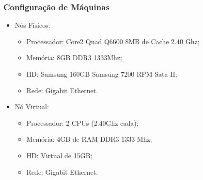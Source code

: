 \documentclass{beamer}
\begin{document}
\begin{frame} \frametitle{Configuração de Máquinas}
\begin{itemize}
	\item Nós Físicos:
	\begin{itemize}
  		\item Processador: Core2 Quad Q6600 8MB de Cache 2.40 Ghz;
  		\item Memória: 8GB DDR3 1333Mhz;
  		\item HD: Samsung 160GB Samsung 7200 RPM Sata II;
  		\item Rede: Gigabit Ethernet.
	\end{itemize}

	\item Nó Virtual:
	\begin{itemize}
  		\item Processador: 2 CPUs (2.40Ghz cada);
 		\item Memória: 4GB de RAM DDR3 1333 Mhz;
  		\item HD: Virtual de 15GB;
  		\item Rede: Gigabit Ethernet.
	\end{itemize}
\end{itemize}
\end{frame}
\end{document}
